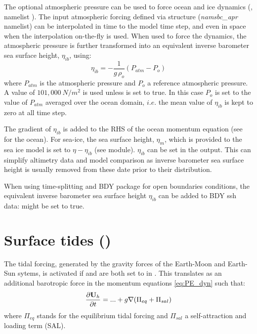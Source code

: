 \documentclass[../tex_main/NEMO_manual]{subfiles}
\begin{document}
The optional atmospheric pressure can be used to force ocean and ice dynamics 
(, \textit{} namelist ).
The input atmospheric forcing defined via  structure (\textit{namsbc\_apr} namelist) 
can be interpolated in time to the model time step, and even in space when the 
interpolation on-the-fly is used. When used to force the dynamics, the atmospheric 
pressure is further transformed into an equivalent inverse barometer sea surface height, 
$\eta_{ib}$, using:
\begin{equation} \label{eq:SBC_ssh_ib}
	\eta_{ib} = -  \frac{1}{g\,\rho_o}  \left( P_{atm} - P_o \right) 
\end{equation}
where $P_{atm}$ is the atmospheric pressure and $P_o$ a reference atmospheric pressure.
A value of $101,000~N/m^2$ is used unless  is set to true. In this case $P_o$ 
is set to the value of $P_{atm}$ averaged over the ocean domain, $i.e.$ the mean value of 
$\eta_{ib}$ is kept to zero at all time step.

The gradient of $\eta_{ib}$ is added to the RHS of the ocean momentum equation 
(see  for the ocean). For sea-ice, the sea surface height, $\eta_m$, 
which is provided to the sea ice model is set to $\eta - \eta_{ib}$ (see  module).
$\eta_{ib}$ can be set in the output. This can simplify altimetry data and model comparison 
as inverse barometer sea surface height is usually removed from these date prior to their distribution.

When using time-splitting and BDY package for open boundaries conditions, the equivalent 
inverse barometer sea surface height $\eta_{ib}$ can be added to BDY ssh data: 
  might be set to true.

\section{Surface tides (\protect{})}
\label{sec:SBC_tide}


The tidal forcing, generated by the gravity forces of the Earth-Moon and Earth-Sun sytems, is activated if  and  are both set to  in . This translates as an additional barotropic force in the momentum equations \ref{eq:PE_dyn} such that:
\begin{equation}     \label{eq:PE_dyn_tides}
\frac{\partial {\rm {\bf U}}_h }{\partial t}= ...
+g\nabla (\Pi_{eq} + \Pi_{sal}) 
\end{equation} 
where $\Pi_{eq}$ stands for the equilibrium tidal forcing and $\Pi_{sal}$ a self-attraction and loading term (SAL). 
 
\end{document}
